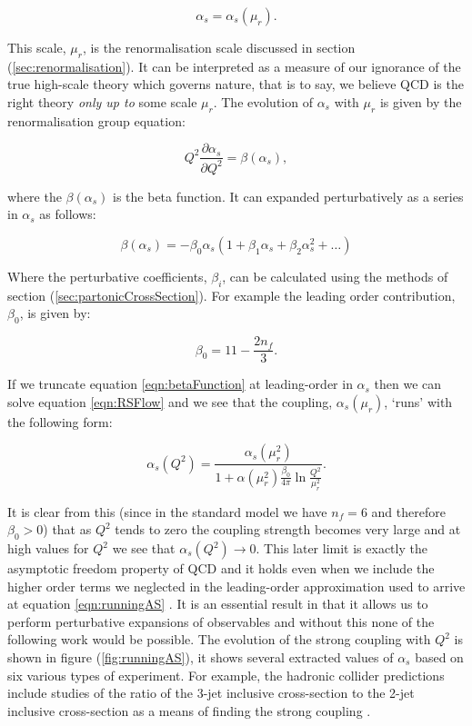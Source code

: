 	\begin{equation}
		\alpha_s = \alpha_s(\mu_r).
	\end{equation}

	This scale, $\mu_r$, is the renormalisation scale discussed in section (\ref{sec:renormalisation}).  It can be interpreted as a measure of our ignorance of the
	true high-scale theory which governs nature, that is to say, we believe QCD is the right theory \emph{only up to} some
	scale $\mu_r$.  The evolution of $\alpha_s$ with $\mu_r$ is given by the renormalisation group equation:

	\begin{equation}
		Q^2\frac{\partial\alpha_s}{\partial Q^2} = \beta(\alpha_s),
		\label{eqn:RSFlow}
	\end{equation}

	where the $\beta(\alpha_s)$ is the beta function.  It can expanded perturbatively as a series in $\alpha_s$
	as follows:

	\begin{equation}
		\beta(\alpha_s) = -\beta_0\alpha_s\left(1 + \beta_1\alpha_s + \beta_2\alpha_s^2 + \ldots \right)
		\label{eqn:betaFunction}
	\end{equation}

	Where the perturbative coefficients, $\beta_i$, can be calculated using the methods of section (\ref{sec:partonicCrossSection}).
	For example the leading order contribution, $\beta_0$, is given by:

	\begin{equation}
		\beta_0 = 11 - \frac{2n_f}{3}.
	\end{equation}

	If we truncate equation \eqref{eqn:betaFunction} at leading-order in $\alpha_s$ then we can solve equation \eqref{eqn:RSFlow}
	and we see that the coupling, $\alpha_s(\mu_r)$, `runs' with the following form:

	\begin{equation}
		\alpha_s(Q^2) = \frac{\alpha_s(\mu_r^2)}{1 + \alpha(\mu_r^2)\frac{\beta_0}{4\pi}\ln\frac{Q^2}{\mu_r^2}}.
		\label{eqn:runningAS}
	\end{equation}

	It is clear from this (since in the standard model we have $n_f=6$ and therefore $\beta_0>0$) that as $Q^2$ tends to
	zero the coupling strength becomes very large and at high values for $Q^2$ we see that $\alpha_s(Q^2)\rightarrow0$.
	This later limit is exactly the asymptotic freedom property of QCD and it holds even when we include the higher order
	terms we neglected in the leading-order approximation used to arrive at equation \eqref{eqn:runningAS} \cite{Beringer:1900zz}.
	It is an essential result in that it allows us to perform perturbative expansions of observables and without this none of the
	following work would be possible.  The evolution of the strong coupling with $Q^2$ is shown in figure (\ref{fig:runningAS}),
	it shows several extracted values of $\alpha_s$ based on six various types of experiment.  For example, the hadronic
	collider predictions include studies of the ratio of the 3-jet inclusive cross-section to the 2-jet inclusive
	cross-section as a means of finding the strong coupling \cite{Chatrchyan:2013txa}.

